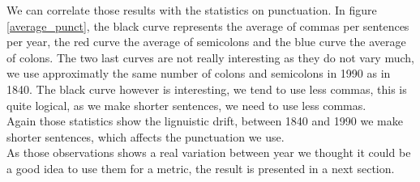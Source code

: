 We can correlate those results with the statistics on punctuation. In figure \ref{average_punct}, the black curve represents the average of commas per sentences per year, the red curve the average of semicolons and the blue curve the average of colons. The two last curves are not really interesting as they do not vary much, we use approximatly the same number of colons and semicolons in 1990 as in 1840. The black curve however is interesting, we tend to use less commas, this is quite logical, as we make shorter sentences, we need to use less commas.\\

Again those statistics show the lignuistic drift, between 1840 and 1990 we make shorter sentences, which affects the punctuation we use. \\

As those observations shows a real variation between year we thought it could be a good idea to use them for a metric, the result is presented in a next section.